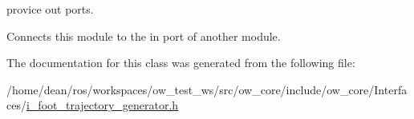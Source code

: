 provice out ports. 

Connects this module to the in port of another module. 

The documentation for this class was generated from the following file\+:\begin{DoxyCompactItemize}
\item 
/home/dean/ros/workspaces/ow\+\_\+test\+\_\+ws/src/ow\+\_\+core/include/ow\+\_\+core/\+Interfaces/\hyperlink{i__foot__trajectory__generator_8h}{i\+\_\+foot\+\_\+trajectory\+\_\+generator.\+h}\end{DoxyCompactItemize}

